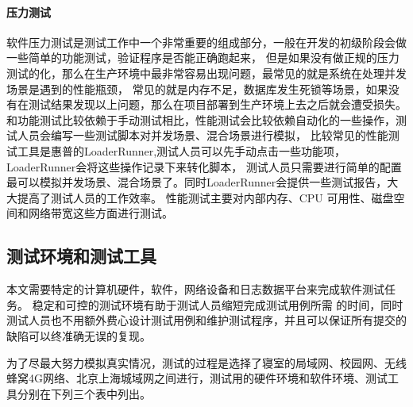 \paragraph{压力测试}
软件压力测试是测试工作中一个非常重要的组成部分，一般在开发的初级阶段会做一些简单的功能测试，验证程序是否能正确跑起来，
但是如果没有做正规的压力测试的化，那么在生产环境中最非常容易出现问题，最常见的就是系统在处理并发场景是遇到的性能瓶颈，
常见的就是内存不足，数据库发生死锁等场景，如果没有在测试结果发现以上问题，那么在项目部署到生产环境上去之后就会遭受损失。
和功能测试比较依赖于手动测试相比，性能测试会比较依赖自动化的一些操作，测试人员会编写一些测试脚本对并发场景、混合场景进行模拟，
比较常见的性能测试工具是惠普的LoaderRunner,测试人员可以先手动点击一些功能项，LoaderRunner会将这些操作记录下来转化脚本，
测试人员只需要进行简单的配置最可以模拟并发场景、混合场景了。同时LoaderRunner会提供一些测试报告，大大提高了测试人员的工作效率。
性能测试主要对内部内存、CPU 可用性、磁盘空间和网络带宽这些方面进行测试。

\subsection{测试环境和测试工具}
本文需要特定的计算机硬件，软件，网络设备和日志数据平台来完成软件测试任务。 稳定和可控的测试环境有助于测试人员缩短完成测试用例所需
的时间，同时测试人员也不用额外费心设计测试用例和维护测试程序，并且可以保证所有提交的缺陷可以终准确无误的复现。

为了尽最大努力模拟真实情况，测试的过程是选择了寝室的局域网、校园网、无线蜂窝4G网络、北京上海城域网之间进行，测试用的硬件环境和软件环境、测试工具分别在下列三个表中列出。


